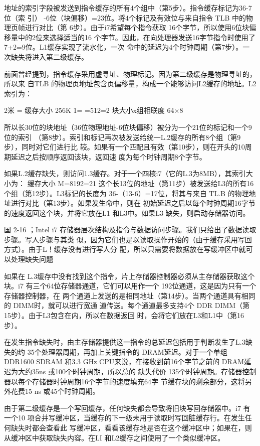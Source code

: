 地址的索引字段被发送到指令缓存的所有4个组中（第5步）。指令缓存标记为36-7位（索
引） -6位（块偏移）=23位。将4个标记及有效位与来自指令 TLB 中的物理页帧进行对比（第
6步）。由于i7希望每个指令获取 16个字节，所以使用6位块偏移量中的2位来选择适当的16
个字节。因此，在向处理器发送16字节指令时使用了7+2=9位。L1缓存实现了流水化，一次
命中的延迟为4个时钟周期（第7步）。一次缺失将进入第二级缓存。

前面曾经提到，指令缓存采用虚寻址、物理标记。因为第二级缓存是物理寻址的，所以来
自TLB 的物理页地址包含页偏移量，构成一个能够访问L2缓存的地址。L2索引为：

2米 =
缓存大小
256K
1=
=512=2%
块大小x组相联度 64×8

所以长30位的块地址（36位物理地址-6位块偏移）被分为一个21位的标记和一个9位的索引
（第8步）。索引和标记再次被发送给统一L.2缓存的所有8个组（第9步），同时对它们进行比
较。如果有一个匹配且有效（第10步），则在开头的10周期延迟之后按顺序返回该块，返回速
度为每个时钟周期8个字节。

如果L.2缓存缺失，则访问1.3缓存。对于一个四核i7（它的L.3为8MB），其索引大小为：
缓存大小
M=8192=21
这个长13位的地址（第11步）被发送给L3的所有16个组（第12步）。L3标记的长度为
36-（13-6）=17位，将其与来自 TL.B 的物理地址进行对比（第13步）。如果发生命中，则在
初始延迟之后以每个时钟周期16字节的速度返回这个块，并将它放在L1 和L3中。如果L3
缺失，则启动存储器访问。

国 2-16
；Intel i7 存储器层次结构及指令与数据访问步骤。我们只给出了数据读取步骤。写人步骤与其类
似，因为它们也是以读取操作开始的（由于缓存采用写回方式）。由于L！缓存没有进行写人分
配，所以只需要将数据放在写缓冲区中就可以处理缺失问题

如果在 L.3缓存中没有找到这个指令，片上存储器控制器必须从主存储器获取这个块。i7
有三个64位存储器通道，它们可以用作一个 192位通道，这是因为只有一个存储器控制器，在
两个通道上发送的是相同地址（第14步）。当两个通道具有相同的 DIMM时，就可以进行宽通
道传送。每个通道最多支持4个 DDR DIMM（第15步）。由于L3包含在内，所以在数据返回
时，会将它们放在L3和L1中（第16步）。

在发生指令缺失时，由主存储器提供这一指令的总延迟包括用于判断发生了L.3缺失的约
35个处理器周期，再加上关键指令的 DRAM延迟。对于一个单组 DDR1600 SDRAM 和3.3 GHz
CPU来说，在接收到前16个字节之前的 DRAM延迟为大约35ns 或100个时钟周期，所以总的
缺失代价 135个时钟周期。存储器控制器以每个存储器时钟周期16个字节的速度填充64字
节缓存块的剩余部分，这将另外花费15 ns 或45个时钟周期。

由于第二级缓存是一个写回缓存，任何缺失都会导致将旧块写回存储器中。i7 有一个10
项合并写缓冲区，当缓存的下一级未用于读取时写回脏缓存行。在发生任何缺失时都会查看此
写缓冲区，看看该缓存地是否在这个缓冲区中；如果在，则从缓冲区中获取缺失内容。在LI
和L2缓存之间使用了一个类似缓冲区。

